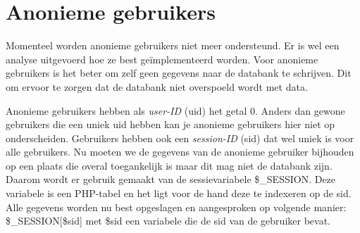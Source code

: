 \section{Anonieme gebruikers}
Momenteel worden anonieme gebruikers niet meer ondersteund. Er is wel een analyse uitgevoerd hoe ze best ge\"{i}mplementeerd worden. Voor anonieme gebruikers is het beter om zelf geen gegevens naar de databank te schrijven. Dit om ervoor te zorgen dat de databank niet overspoeld wordt met data.

Anonieme gebruikers hebben als \textit{user-ID} (uid) het getal 0. Anders dan gewone gebruikers die een uniek uid hebben kan je anonieme gebruikers hier niet op onderscheiden. Gebruikers hebben ook een \textit{session-ID} (sid) dat wel uniek is voor alle gebruikers. Nu moeten we de gegevens van de anonieme gebruiker bijhouden op een plaats die overal toegankelijk is maar dit mag niet de databank zijn. Daarom wordt er gebruik gemaakt van de sessievariabele \cite{sessionVariable} \$\_SESSION. Deze variabele is een PHP-tabel en het ligt voor de hand deze te indexeren op de sid. Alle gegevens worden nu best opgeslagen en aangesproken op volgende manier: \$\_SESSION[\$sid] met \$sid een variabele die de sid van de gebruiker bevat. 